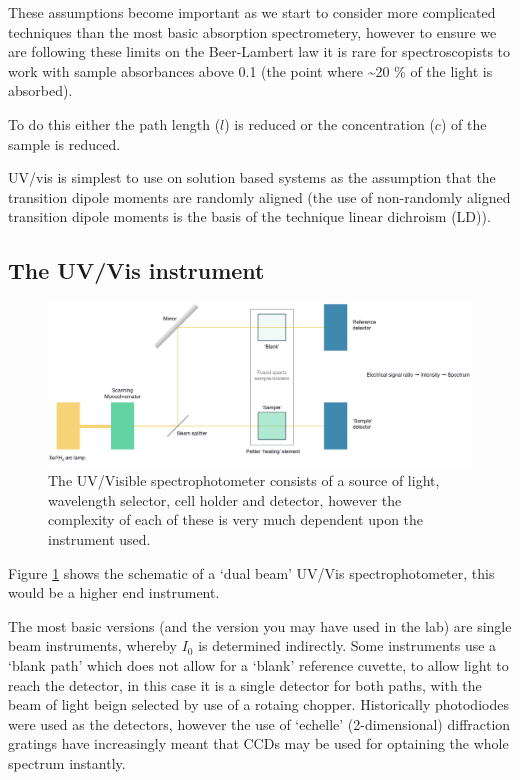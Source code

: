 \documentclass[
]{book}
\begin{document}
These assumptions become important as we start to consider more complicated techniques than the most basic absorption spectrometery, however to ensure we are following these limits on the Beer-Lambert law it is rare for spectroscopists to work with sample absorbances above 0.1 (the point where \textasciitilde20 \% of the light is absorbed).

To do this either the path length (\(l\)) is reduced or the concentration (\(c\)) of the sample is reduced.

UV/vis is simplest to use on solution based systems as the assumption that the transition dipole moments are randomly aligned (the use of non-randomly aligned transition dipole moments is the basis of the technique linear dichroism (LD)).

\hypertarget{sec:UVinstrument}{%
\subsection{The UV/Vis instrument}\label{sec:UVinstrument}}

\begin{figure}

{\centering \includegraphics[width=1\linewidth]{images/UVvis} 

}

\caption{The UV/Visible spectrophotometer consists of a source of light, wavelength selector, cell holder and detector, however the complexity of each of these is very much dependent upon the instrument used.}\label{fig:UV}
\end{figure}

Figure \ref{fig:UV} shows the schematic of a `dual beam' UV/Vis spectrophotometer, this would be a higher end instrument.

The most basic versions (and the version you may have used in the lab) are single beam instruments, whereby \(I_0\) is determined indirectly. Some instruments use a `blank path' which does not allow for a `blank' reference cuvette, to allow light to reach the detector, in this case it is a single detector for both paths, with the beam of light beign selected by use of a rotaing chopper. Historically photodiodes were used as the detectors, however the use of `echelle' (2-dimensional) diffraction gratings have increasingly meant that CCDs may be used for optaining the whole spectrum instantly.
\end{document}
